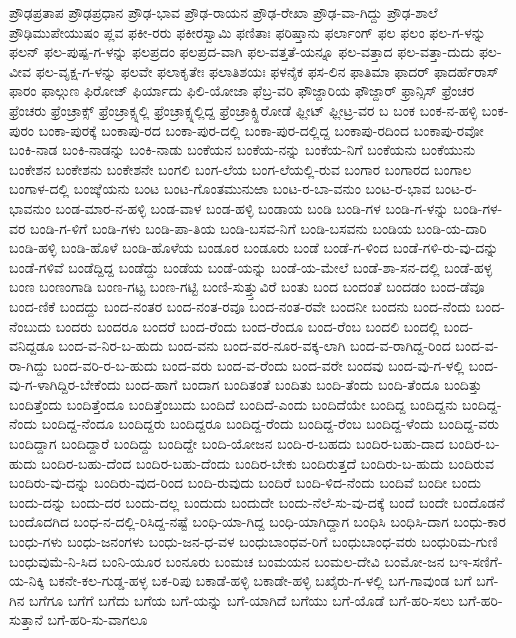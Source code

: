 ಪ್ರೌಢಪ್ರತಾಪ
ಪ್ರೌಢಪ್ರಧಾನ
ಪ್ರೌಢ-ಭಾವ
ಪ್ರೌಢ-ರಾಯನ
ಪ್ರೌಢ-ರೇಖಾ
ಪ್ರೌಢ-ವಾ-ಗಿದ್ದು
ಪ್ರೌಢ-ಶಾಲೆ
ಪ್ರೌಢಿಮುಪೇಯುಷಂ
ಪ್ಲವ
ಫಕೀ-ರರು
ಫಕೀರಸ್ವಾಮಿ
ಫಣಿತಾಃ
ಫರಿಷ್ತಾನು
ಫರ್ಲಾಂಗ್
ಫಲ
ಫಲಂ
ಫಲ-ಗ-ಳನ್ನು
ಫಲನ್
ಫಲ-ಪುಷ್ಪ-ಗ-ಳನ್ನು
ಫಲಪ್ರದಂ
ಫಲಪ್ರದ-ವಾಗಿ
ಫಲ-ವತ್ತತೆ-ಯನ್ನೂ
ಫಲ-ವತ್ತಾದ
ಫಲ-ವತ್ತಾ-ದುದು
ಫಲ-ವೀವ
ಫಲ-ವೃಕ್ಷ-ಗ-ಳನ್ನು
ಫಲವೇ
ಫಲಾಕೃತೇಃ
ಫಲಾತಿಶಯಃ
ಫಳನೈಕ
ಫಸ-ಲಿನ
ಫಾತಿಮಾ
ಫಾದರ್
ಫಾದರ್ಹೆರಾಸ್
ಫಾರಂ
ಫಾಲ್ಗುಣ
ಫಿರೋಜ್
ಫಿರ್ಯಾದು
ಫಿಲಿ-ಯೋಜಾ
ಫೆಬ್ರ-ವರಿ
ಫೌಜ್ದಾರಿಯ
ಫೌಜ್ದಾರ್
ಫ್ರಾನ್ಸಿಸ್
ಫ್ರೆಂಚರ
ಫ್ರೆಂಚರು
ಫ್ರೆಂಚ್ರಾಕ್ಸ್
ಫ್ರೆಂಚ್ರಾಕ್ಸ್ನಲ್ಲಿ
ಫ್ರೆಂಚ್ರಾಕ್ಸ್ನಲ್ಲಿದ್ದ
ಫ್ರೆಂಚ್ರಾಕ್ಸ್ಹಿರೋಡೆ
ಫ್ಲೀಟ್
ಫ್ಲೀಟ್ರ-ವರ
ಬ
ಬಂಕ
ಬಂಕ-ನ-ಹಳ್ಳಿ
ಬಂಕ-ಪುರಂ
ಬಂಕಾ-ಪುರಕ್ಕೆ
ಬಂಕಾಪು-ರದ
ಬಂಕಾ-ಪುರ-ದಲ್ಲಿ
ಬಂಕಾ-ಪುರ-ದಲ್ಲಿದ್ದ
ಬಂಕಾಪು-ರದಿಂದ
ಬಂಕಾಪು-ರವೋ
ಬಂಕಿ-ನಾಡ
ಬಂಕಿ-ನಾಡನ್ನು
ಬಂಕಿ-ನಾಡು
ಬಂಕೆಯನ
ಬಂಕೆಯ-ನನ್ನು
ಬಂಕೆಯ-ನಿಗೆ
ಬಂಕೆಯನು
ಬಂಕೆಯುನು
ಬಂಕೇಶನ
ಬಂಕೇಶನು
ಬಂಕೇಶನೇ
ಬಂಗಲಿ
ಬಂಗ-ಲೆಯ
ಬಂಗ-ಲೆಯಲ್ಲಿ-ರುವ
ಬಂಗಾರ
ಬಂಗಾರದ
ಬಂಗಾಲ
ಬಂಗಾಳ-ದಲ್ಲಿ
ಬಂಙ್ಕೆಯನು
ಬಂಟ
ಬಂಟ-ಗೊಂತಮುನುಱಾ
ಬಂಟ-ರ-ಬಾ-ವನುಂ
ಬಂಟ-ರ-ಭಾವ
ಬಂಟ-ರ-ಭಾವನುಂ
ಬಂಡ-ಮಾರ-ನ-ಹಳ್ಳಿ
ಬಂಡ-ವಾಳ
ಬಂಡ-ಹಳ್ಳಿ
ಬಂಡಾಯ
ಬಂಡಿ
ಬಂಡಿ-ಗಳ
ಬಂಡಿ-ಗ-ಳನ್ನು
ಬಂಡಿ-ಗಳ-ವರ
ಬಂಡಿ-ಗ-ಳಿಗೆ
ಬಂಡಿ-ಗಳು
ಬಂಡಿ-ಪಾ-ತಿಯ
ಬಂಡಿ-ಬಸವ-ನಿಗೆ
ಬಂಡಿ-ಬಸವನು
ಬಂಡಿಯ
ಬಂಡಿ-ಯ-ದಾರಿ
ಬಂಡಿ-ಹಳ್ಳಿ
ಬಂಡಿ-ಹೊಳೆ
ಬಂಡಿ-ಹೊಳೆಯ
ಬಂಡೂರ
ಬಂಡೂರು
ಬಂಡೆ
ಬಂಡೆ-ಗ-ಳಿಂದ
ಬಂಡೆ-ಗಳಿ-ರು-ವು-ದನ್ನು
ಬಂಡೆ-ಗಳಿವೆ
ಬಂಡೆದ್ದಿದ್ದ
ಬಂಡೆದ್ದು
ಬಂಡೆಯ
ಬಂಡೆ-ಯನ್ನು
ಬಂಡೆ-ಯ-ಮೇಲೆ
ಬಂಡೆ-ಶಾ-ಸನ-ದಲ್ಲಿ
ಬಂಡೆ-ಹಳ್ಳ
ಬಂಣ
ಬಂಣಂಗಾಡಿ
ಬಂಣ-ಗಟ್ಟ
ಬಂಣ-ಗಟ್ಟಿ
ಬಂಣಿ-ಸುತ್ತ್ತುವಿರೆ
ಬಂತು
ಬಂದ
ಬಂದಂತೆ
ಬಂದಡಂ
ಬಂದ-ಡೆವೂ
ಬಂದ-ಣಿಕೆ
ಬಂದದ್ದು
ಬಂದ-ನಂತರ
ಬಂದ-ನಂತ-ರವೂ
ಬಂದ-ನಂತ-ರವೇ
ಬಂದನೀ
ಬಂದನು
ಬಂದ-ನೆಂದು
ಬಂದ-ನೆಂಬುದು
ಬಂದರು
ಬಂದರೂ
ಬಂದರೆ
ಬಂದ-ರೆಂದು
ಬಂದ-ರೆಂದೂ
ಬಂದ-ರೆಂಬ
ಬಂದಲಿ
ಬಂದಲ್ಲಿ
ಬಂದ-ವನಿದ್ದಡೂ
ಬಂದ-ವ-ನಿರ-ಬ-ಹುದು
ಬಂದ-ವನು
ಬಂದ-ವರ-ನೂರ-ವಕ್ಕ-ಲಾಗಿ
ಬಂದ-ವ-ರಾಗಿದ್ದ-ರಿಂದ
ಬಂದ-ವ-ರಾ-ಗಿದ್ದು
ಬಂದ-ವರಿ-ರ-ಬ-ಹುದು
ಬಂದ-ವರು
ಬಂದ-ವ-ರೆಂದು
ಬಂದ-ವರೇ
ಬಂದವು
ಬಂದ-ವು-ಗ-ಳಲ್ಲಿ
ಬಂದ-ವು-ಗ-ಳಾಗಿದ್ದಿರ-ಬೇಕೆಂದು
ಬಂದ-ಹಾಗೆ
ಬಂದಾಗ
ಬಂದಿತಂತೆ
ಬಂದಿತು
ಬಂದಿ-ತೆಂದು
ಬಂದಿ-ತೆಂದೂ
ಬಂದಿತ್ತು
ಬಂದಿತ್ತೆಂದು
ಬಂದಿತ್ತೆಂದೂ
ಬಂದಿತ್ತೆಂಬುದು
ಬಂದಿದೆ
ಬಂದಿದೆ-ಎಂದು
ಬಂದಿದೆಯೇ
ಬಂದಿದ್ದ
ಬಂದಿದ್ದನು
ಬಂದಿದ್ದ-ನೆಂದು
ಬಂದಿದ್ದ-ನೆಂದೂ
ಬಂದಿದ್ದರು
ಬಂದಿದ್ದರೂ
ಬಂದಿದ್ದ-ರೆಂದು
ಬಂದಿದ್ದ-ರೆಂಬ
ಬಂದಿದ್ದ-ಳೆಂದು
ಬಂದಿದ್ದ-ವರು
ಬಂದಿದ್ದಾಗ
ಬಂದಿದ್ದಾರೆ
ಬಂದಿದ್ದು
ಬಂದಿದ್ದೇ
ಬಂದಿ-ಯೋಜನ
ಬಂದಿ-ರ-ಬಹದು
ಬಂದಿರ-ಬಹು-ದಾದ
ಬಂದಿರ-ಬ-ಹುದು
ಬಂದಿರ-ಬಹು-ದೆಂದ
ಬಂದಿರ-ಬಹು-ದೆಂದು
ಬಂದಿರ-ಬೇಕು
ಬಂದಿರುತ್ತದೆ
ಬಂದಿರು-ಬ-ಹುದು
ಬಂದಿರುವ
ಬಂದಿರು-ವು-ದನ್ನು
ಬಂದಿರು-ವುದ-ರಿಂದ
ಬಂದಿ-ರುವುದು
ಬಂದಿರೆ
ಬಂದಿ-ಳಿದ-ನೆಂದು
ಬಂದಿವೆ
ಬಂದೀ
ಬಂದು
ಬಂದು-ದನ್ನು
ಬಂದು-ದರ
ಬಂದು-ದಲ್ಲ
ಬಂದುದು
ಬಂದುದೇ
ಬಂದು-ನೆಲೆ-ಸು-ವು-ದಕ್ಕೆ
ಬಂದೆ
ಬಂದೇ
ಬಂದೊಡನೆ
ಬಂದೊದಗಿದ
ಬಂಧ-ನ-ದಲ್ಲಿ-ರಿಸಿದ್ದ-ನಷ್ಟೆ
ಬಂಧಿ-ಯಾ-ಗಿದ್ದ
ಬಂಧಿ-ಯಾಗಿದ್ದಾಗ
ಬಂಧಿಸಿ
ಬಂಧಿಸಿ-ದಾಗ
ಬಂಧು-ಕಾರ
ಬಂಧು-ಗಳು
ಬಂಧು-ಜನಂಗಳು
ಬಂಧು-ಜನ-ಧ-ವಳ
ಬಂಧುಬಾಂಧವ-ರಿಗೆ
ಬಂಧುಬಾಂಧ-ವರು
ಬಂಧುರಿಮ-ಗುಣಿ
ಬಂಧುವುಮೆ-ನಿ-ಸಿದ
ಬಂನಿ-ಯೂರ
ಬಂನೂರು
ಬಂಮಚ
ಬಂಮಯನ
ಬಂಮಲ-ದೇವಿ
ಬಂಮೋ-ಜನ
ಬಇ-ಸಣಿಗೆ-ಯ-ನಿಕ್ಕಿ
ಬಕನೇ-ಕಲ-ಗುಡ್ಡ-ಹಳ್ಳ
ಬಕ-ರಿಪು
ಬಕಾಡೆ-ಹಳ್ಳಿ
ಬಕಾಡೇ-ಹಳ್ಳಿ
ಬಖೈರು-ಗ-ಳಲ್ಲಿ
ಬಗ-ಗಾವುಂಡ
ಬಗೆ
ಬಗೆ-ಗಿನ
ಬಗೆಗೂ
ಬಗೆಗೆ
ಬಗೆದು
ಬಗೆಯ
ಬಗೆ-ಯನ್ನು
ಬಗೆ-ಯಾಗಿದೆ
ಬಗೆಯು
ಬಗೆ-ಯೊಡೆ
ಬಗೆ-ಹರಿ-ಸಲು
ಬಗೆ-ಹರಿ-ಸುತ್ತಾನೆ
ಬಗೆ-ಹರಿ-ಸು-ವಾಗಲೂ
